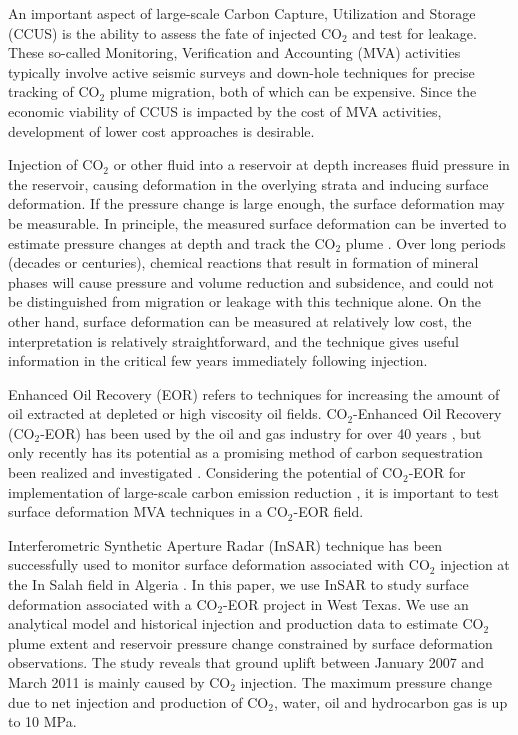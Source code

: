 An important aspect of large-scale Carbon Capture, Utilization and Storage (CCUS) is the ability to assess the fate of injected CO$_{2}$ and test for leakage.  These so-called Monitoring, Verification and Accounting (MVA) activities typically involve active seismic surveys and down-hole techniques for precise tracking of CO$_{2}$ plume migration, both of which can be expensive.  Since the economic viability of CCUS is impacted by the cost of MVA activities, development of lower cost approaches is desirable.

Injection of CO$_{2}$ or other fluid into a reservoir at depth increases fluid pressure in the reservoir, causing deformation in the overlying strata and inducing surface deformation.  If the pressure change is large enough, the surface deformation may be measurable.  In principle, the measured surface deformation can be inverted to estimate pressure changes at depth and track the CO$_{2}$ plume \cite[e.g.,][]{vasco2008reservoir,vasco2010satellite,rinaldi2013modeling,white2014geomechanical,karegar2015gps}.  Over long periods (decades or centuries), chemical reactions that result in formation of mineral phases will cause pressure and volume reduction and subsidence, and could not be distinguished from migration or leakage with this technique alone.  On the other hand, surface deformation can be measured at relatively low cost, the interpretation is relatively straightforward, and the technique gives useful information in the critical few years immediately following injection.

Enhanced Oil Recovery (EOR) refers to techniques for increasing the amount of oil extracted at depleted or high viscosity oil fields.   CO$_{2}$-Enhanced Oil Recovery (CO$_{2}$-EOR) has been used by the oil and gas industry for over 40 years \cite[]{orr1984use}, but only recently has its potential as a promising method of carbon sequestration been realized and investigated \cite[]{bryant2007geologic}.  Considering the potential of CO$_{2}$-EOR for implementation of large-scale carbon emission reduction \cite[]{metz2005carbon}, it is important to test surface deformation MVA techniques in a CO$_{2}$-EOR field.

Interferometric Synthetic Aperture Radar (InSAR) technique has been successfully used to monitor surface deformation associated with CO$_{2}$ injection at the In Salah field in Algeria \cite[]{mathias2009approximate,morris2011study,shi2012assessment,verdon2013comparison}.  In this paper, we use InSAR to study surface deformation associated with a CO$_{2}$-EOR project in West Texas.  We use an analytical model and historical injection and production data to estimate CO$_{2}$ plume extent and reservoir pressure change constrained by surface deformation observations. The study reveals that ground uplift between January 2007 and March 2011 is mainly caused by CO$_{2}$ injection.   The maximum pressure change due to net injection and production of CO$_{2}$, water, oil and hydrocarbon gas is up to 10 MPa.

